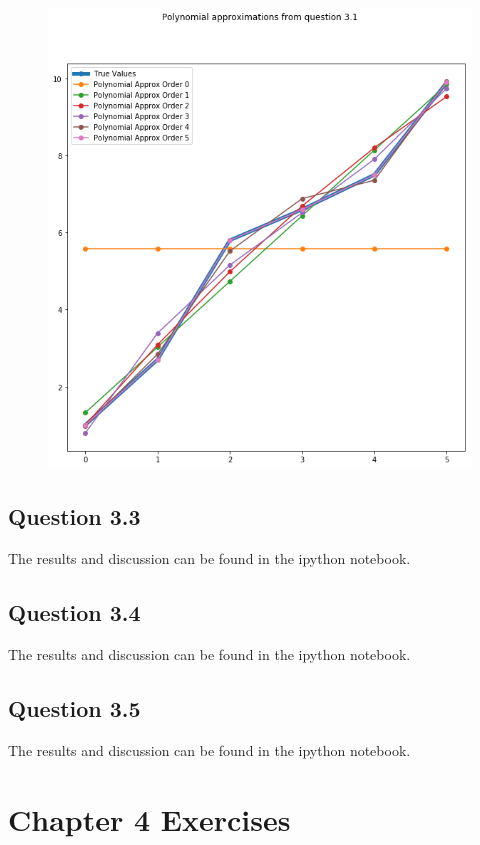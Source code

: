 \documentclass[12pt,a4paper]{report}
\begin{document}
\begin{center}
\begin{figure}[H]
\includegraphics[width=\textwidth]{poly_approx.png} 
\end{figure}
\end{center}

\subsection*{Question 3.3}
The results and discussion can be found in the ipython notebook.


\subsection*{Question 3.4}
The results and discussion can be found in the
ipython notebook.

\subsection*{Question 3.5}
The results and discussion can be found in the
ipython notebook.


\section*{Chapter 4 Exercises}
\end{document}
